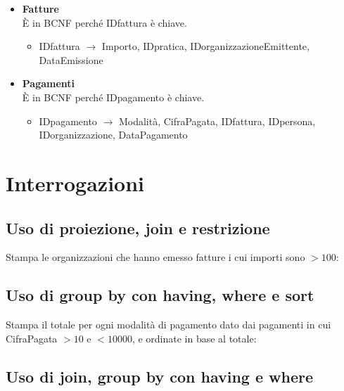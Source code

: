 \documentclass[a4paper,12pt]{article}
\begin{document}
\begin{itemize}
\item \textbf{Fatture}\\È in BCNF perché IDfattura è chiave.

\begin{itemize}
\item IDfattura $\rightarrow$ Importo, IDpratica, IDorganizzazioneEmittente, DataEmissione
\end{itemize}

\item \textbf{Pagamenti}\\È in BCNF perché IDpagamento è chiave.

\begin{itemize}
\item IDpagamento $\rightarrow$ Modalità, CifraPagata, IDfattura, IDpersona, IDorganizzazione, DataPagamento
\end{itemize}

\end{itemize}

 \section{ Interrogazioni }


 \subsection{ Uso di proiezione, join e restrizione }
Stampa le organizzazioni che hanno emesso fatture i cui importi sono $> 100$:

\begin{minipage}{\textwidth}

\end{minipage}


 \subsection{ Uso di group by con having, where e sort }

Stampa il totale per ogni modalità di pagamento dato dai pagamenti in cui CifraPagata $> 10$ e $< 10000$, e ordinate in base al totale:

\begin{minipage}{\textwidth}

\end{minipage}


 \subsection{ Uso di join, group by con having e where }
\end{document}
